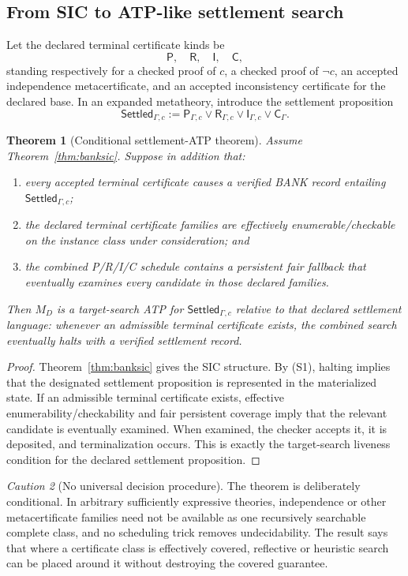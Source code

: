 \documentclass[11pt]{article}
\newtheorem{theorem}{Theorem}[section]
\theoremstyle{definition}
\theoremstyle{remark}
\newtheorem{caution}[theorem]{Caution}
\begin{document}
\subsection{From SIC to ATP-like settlement search}
Let the declared terminal certificate kinds be
\[
\mathsf P,\quad \mathsf R,\quad \mathsf I,\quad \mathsf C,
\]
standing respectively for a checked proof of $c$, a checked proof of $\neg c$, an accepted independence metacertificate, and an accepted inconsistency certificate for the declared base. In an expanded metatheory, introduce the settlement proposition
\[
\mathsf{Settled}_{\Gamma,c}
:=
\mathsf P_{\Gamma,c}\vee
\mathsf R_{\Gamma,c}\vee
\mathsf I_{\Gamma,c}\vee
\mathsf C_{\Gamma}.
\]

\begin{theorem}[Conditional settlement-ATP theorem]\label{thm:settatp}
Assume Theorem~\ref{thm:banksic}. Suppose in addition that:
\begin{enumerate}[label=(S\arabic*)]
\item every accepted terminal certificate causes a verified BANK record entailing $\mathsf{Settled}_{\Gamma,c}$;
\item the declared terminal certificate families are effectively enumerable/checkable on the instance class under consideration; and
\item the combined P/R/I/C schedule contains a persistent fair fallback that eventually examines every candidate in those declared families.
\end{enumerate}
Then $M_D$ is a target-search ATP for $\mathsf{Settled}_{\Gamma,c}$ relative to that declared settlement language: whenever an admissible terminal certificate exists, the combined search eventually halts with a verified settlement record.
\end{theorem}

\begin{proof}
Theorem~\ref{thm:banksic} gives the SIC structure. By (S1), halting implies that the designated settlement proposition is represented in the materialized state. If an admissible terminal certificate exists, effective enumerability/checkability and fair persistent coverage imply that the relevant candidate is eventually examined. When examined, the checker accepts it, it is deposited, and terminalization occurs. This is exactly the target-search liveness condition for the declared settlement proposition.
\end{proof}

\begin{caution}[No universal decision procedure]
The theorem is deliberately conditional. In arbitrary sufficiently expressive theories, independence or other metacertificate families need not be available as one recursively searchable complete class, and no scheduling trick removes undecidability. The result says that where a certificate class is effectively covered, reflective or heuristic search can be placed around it without destroying the covered guarantee.
\end{caution}
\end{document}
